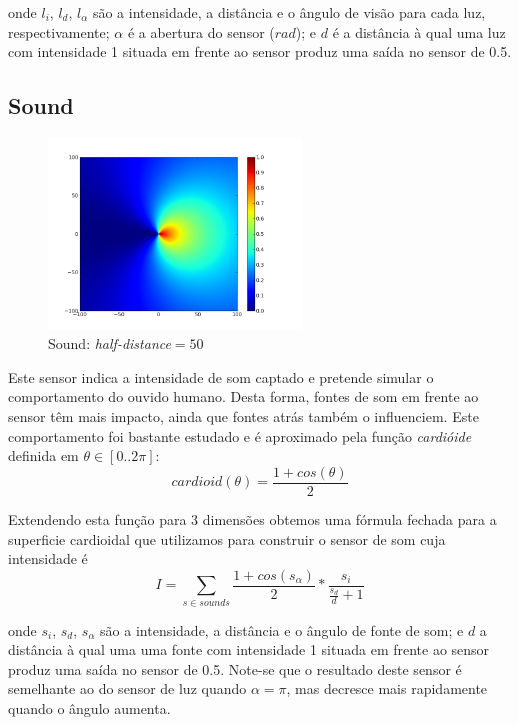 \documentclass[a4paper]{article}
\begin{document}
onde $l_{i}$, $l_{d}$, $l_{\alpha}$ são a intensidade, a distância e o ângulo de visão para cada luz, respectivamente;
$\alpha$ é a abertura do sensor ($rad$);
e $d$ é a distância à qual uma luz com intensidade 1 situada em frente ao sensor produz uma saída no sensor de 0.5.

\cleardoublepage
\subsection{Sound}
\begin{figure}[h]
	\vspace{-20pt}
	\begin{center}
		\includegraphics[width=0.6\textwidth]{graphs/sensors/cardioid.png}
	\end{center}
	\vspace{-20pt}
	\caption{Sound: \emph{half-distance}$=50$}
\end{figure}

\indent Este sensor indica a intensidade de som captado e pretende simular o
comportamento do ouvido humano. Desta forma, fontes de som em frente ao sensor têm mais impacto,
ainda que fontes atrás também o influenciem. Este comportamento foi bastante estudado e é aproximado pela função \emph{cardióide} definida em $\theta \in [0..2\pi]$:
\[
	cardioid(\theta) = \frac{1 + cos(\theta)}{2}
\]

\indent Extendendo esta função para 3 dimensões obtemos uma fórmula fechada para a superficie cardioidal
que utilizamos para construir o sensor de som cuja intensidade é
\[
	I = \displaystyle\sum\limits_{s \in sounds}\frac{1+cos(s_{\alpha})}{2}*\frac{s_{i}}{\frac{s_{d}}{d}+1}
\] 

onde $s_{i}$, $s_{d}$, $s_{\alpha}$ são a intensidade, a distância e o ângulo de fonte de som;
e $d$ a distância à qual uma uma fonte com intensidade 1 situada em frente ao sensor produz uma saída no sensor de 0.5.
Note-se que o resultado deste sensor é semelhante ao do sensor de luz quando $\alpha=\pi$,
mas decresce mais rapidamente quando o ângulo aumenta.
\end{document}
